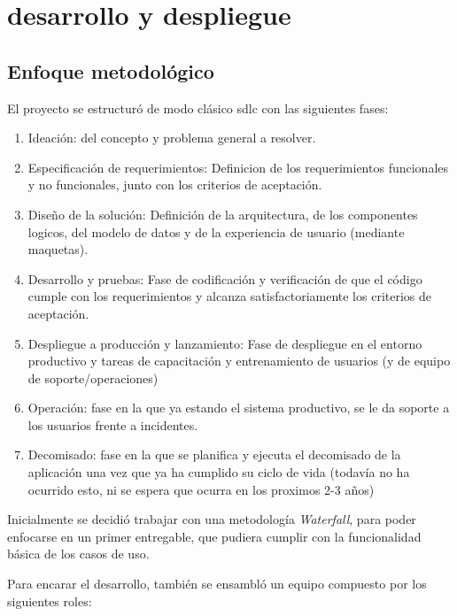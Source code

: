 \chapter{desarrollo y despliegue}
\section{Enfoque metodológico}

El proyecto se estructuró de modo clásico \gls{sdlc} con las siguientes fases:

\begin{enumerate}
    \item Ideación: del concepto y problema general a resolver.
    \item Especificación de requerimientos: Definicion de los requerimientos funcionales y no funcionales, junto con los criterios de aceptación.
    \item Diseño de la solución: Definición de la arquitectura, de los componentes logicos, del modelo de datos y de la experiencia de usuario (mediante maquetas).
    \item Desarrollo y pruebas: Fase de codificación y verificación de que el código cumple con los requerimientos y alcanza satisfactoriamente los criterios de aceptación.
    \item Despliegue a producción y lanzamiento: Fase de despliegue en el entorno productivo y tareas de capacitación y entrenamiento de usuarios (y de equipo de soporte/operaciones)
    \item Operación: fase en la que ya estando el sistema productivo, se le da soporte a los usuarios frente a incidentes.
    \item Decomisado: fase en la que se planifica y ejecuta el decomisado de la aplicación una vez que ya ha cumplido su ciclo de vida (todavía no ha ocurrido esto, ni se espera que ocurra en los proximos 2-3 años)
\end{enumerate}


Inicialmente se decidió trabajar con una metodología \emph{Waterfall}, para poder enfocarse en un primer entregable, que pudiera cumplir con la funcionalidad básica de los casos de uso.


Para encarar el desarrollo, también se ensambló un equipo compuesto por los siguientes roles:

